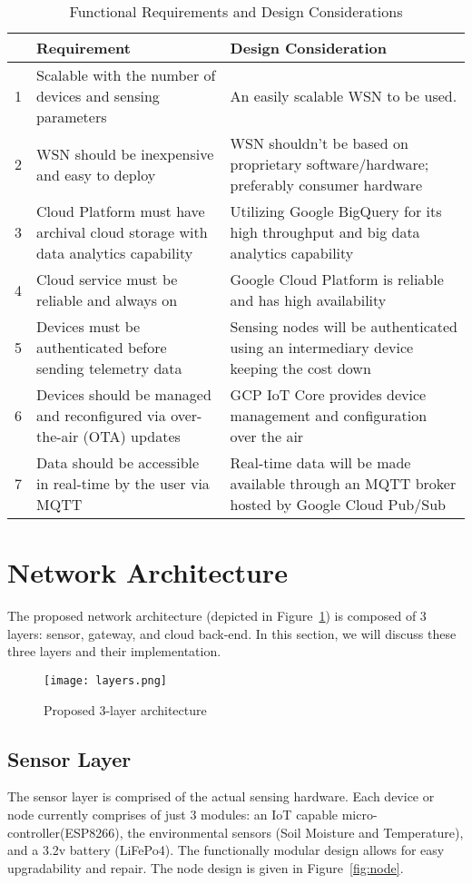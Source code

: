 \renewcommand{\arraystretch}{1.2}
\begin{table}[ht]
\centering
\begin{tabular}{ p{0.4cm} p{5cm} p{6cm}}
  \hline
  & \textbf{Requirement} & \textbf{Design Consideration}\\
  \hline
  1 & Scalable with the number of devices and sensing parameters & An easily scalable WSN to be used.\\
  2 & WSN should be inexpensive and easy to deploy & WSN shouldn't be based on proprietary software/hardware; preferably consumer hardware\\
  3 & Cloud Platform must have archival cloud storage with data analytics capability & Utilizing Google BigQuery for its high throughput and big data analytics capability\\
  4 & Cloud service must be reliable and always on & Google Cloud Platform is reliable and has high availability\\
  5 & Devices must be authenticated before sending telemetry data & Sensing nodes will be authenticated using an intermediary device keeping the cost down\\
  6 & Devices should be managed and reconfigured via over-the-air (OTA) updates & GCP IoT Core provides device management and configuration over the air\\
  7 & Data should be accessible in real-time by the user via MQTT & Real-time data will be made available through an MQTT broker hosted by Google Cloud Pub/Sub\\
  \hline
\end{tabular}
\caption{Functional Requirements and Design Considerations} 
\label{table:designConsideration}
\end{table} 

\newpage
\section{Network Architecture}

The proposed network architecture (depicted in Figure~\ref{fig:layers}) is composed of 3 layers: sensor, gateway, and cloud back-end. In this section, we will discuss these three layers and their implementation.

\begin{figure}[!h]
  \texttt{[image: layers.png]}
  \caption{Proposed 3-layer architecture}
  \label{fig:layers}
\end{figure}

\subsection{Sensor Layer}
  The sensor layer is comprised of the actual sensing hardware. Each device or node currently comprises of just 3 modules: an IoT capable micro-controller(ESP8266), the environmental sensors (Soil Moisture and Temperature), and a 3.2v battery (LiFePo4). The functionally modular design allows for easy upgradability and repair. The node design is given in Figure~\ref{fig:node}.
  
